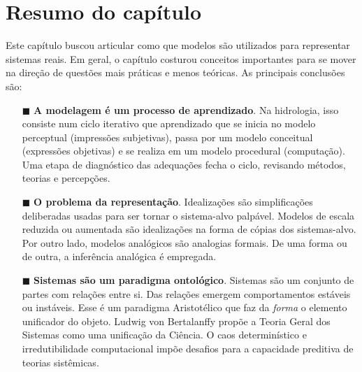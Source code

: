 \documentclass[./main.tex]{subfiles}
\begin{document}
\clearpage

\section{Resumo do capítulo} \label{sec:sys:summary}

\par Este capítulo buscou articular como que modelos são utilizados para representar sistemas reais. Em geral, o capítulo costurou conceitos importantes para se mover na direção de questões mais práticas e menos teóricas. As principais conclusões são:

\begin{itemize}
    \item[$\blacksquare$] \textbf{A modelagem é um processo de aprendizado}. Na hidrologia, isso consiste num ciclo iterativo que aprendizado que se inicia no modelo perceptual (impressões subjetivas), passa por um modelo conceitual (expressões objetivas) e se realiza em um modelo procedural (computação). Uma etapa de diagnóstico das adequações fecha o ciclo, revisando métodos, teorias e percepções.    
    \item[$\blacksquare$] \textbf{O problema da representação}. Idealizações são simplificações deliberadas usadas para ser tornar o sistema-alvo palpável. Modelos de escala reduzida ou aumentada são idealizações na forma de cópias dos sistemas-alvo. Por outro lado, modelos analógicos são analogias formais. De uma forma ou de outra, a inferência analógica é empregada.
    
    \item[$\blacksquare$] \textbf{Sistemas são um paradigma ontológico}. Sistemas são um conjunto de partes com relações entre si. Das relações emergem comportamentos estáveis ou instáveis. Esse é um paradigma Aristotélico que faz da \textit{forma} o elemento unificador do objeto. Ludwig von Bertalanffy propõe a Teoria Geral dos Sistemas como uma unificação da Ciência. O caos determinístico e irredutibilidade computacional impõe desafios para a capacidade preditiva de teorias sistêmicas.
    

\end{itemize}
\end{document}

